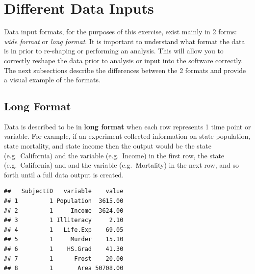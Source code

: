 \documentclass[]{book}
\newenvironment{Shaded}{\begin{snugshade}}{\end{snugshade}}
\newcommand{\CommentTok}[1]{\textcolor[rgb]{0.56,0.35,0.01}{\textit{#1}}}
\newcommand{\DataTypeTok}[1]{\textcolor[rgb]{0.13,0.29,0.53}{#1}}
\newcommand{\DecValTok}[1]{\textcolor[rgb]{0.00,0.00,0.81}{#1}}
\newcommand{\KeywordTok}[1]{\textcolor[rgb]{0.13,0.29,0.53}{\textbf{#1}}}
\newcommand{\NormalTok}[1]{#1}
\newcommand{\OperatorTok}[1]{\textcolor[rgb]{0.81,0.36,0.00}{\textbf{#1}}}
\newcommand{\StringTok}[1]{\textcolor[rgb]{0.31,0.60,0.02}{#1}}
\begin{document}
\hypertarget{different-data-inputs}{%
\section{Different Data Inputs}\label{different-data-inputs}}

Data input formats, for the purposes of this exercise, exist mainly in 2 forms: \emph{wide format} or \emph{long format}. It is important to understand what format the data is in prior to re-shaping or performing an analysis. This will allow you to correctly reshape the data prior to analysis or input into the software correctly. The next subsections describe the differences between the 2 formats and provide a visual example of the formats.

\hypertarget{long-format}{%
\subsection{Long Format}\label{long-format}}

Data is described to be in \textbf{long format} when each row represents 1 time point or variable. For example, if an experiment collected information on state population, state mortality, and state income then the output would be the state (e.g.~California) and the variable (e.g.~Income) in the first row, the state (e.g.~California) and and the variable (e.g.~Mortality) in the next row, and so forth until a full data output is created.

\begin{Shaded}
\end{Shaded}

\begin{verbatim}
##   SubjectID   variable    value
## 1         1 Population  3615.00
## 2         1     Income  3624.00
## 3         1 Illiteracy     2.10
## 4         1   Life.Exp    69.05
## 5         1     Murder    15.10
## 6         1    HS.Grad    41.30
## 7         1      Frost    20.00
## 8         1       Area 50708.00
\end{verbatim}
\end{document}

